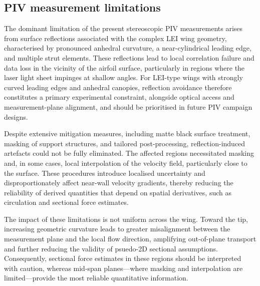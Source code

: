 \documentclass[wes, manuscript]{copernicus}
\begin{document}
\subsection{PIV measurement limitations}
%
The dominant limitation of the present stereoscopic PIV measurements arises from surface reflections associated with the complex LEI wing geometry, characterised by pronounced anhedral curvature, a near-cylindrical leading edge, and multiple strut elements. These reflections lead to local correlation failure and data loss in the vicinity of the airfoil surface, particularly in regions where the laser light sheet impinges at shallow angles. For LEI-type wings with strongly curved leading edges and anhedral canopies, reflection avoidance therefore constitutes a primary experimental constraint, alongside optical access and measurement-plane alignment, and should be prioritised in future PIV campaign designs.

Despite extensive mitigation measures, including matte black surface treatment, masking of support structures, and tailored post-processing, reflection-induced artefacts could not be fully eliminated. The affected regions necessitated masking and, in some cases, local interpolation of the velocity field, particularly close to the surface. These procedures introduce localised uncertainty and disproportionately affect near-wall velocity gradients, thereby reducing the reliability of derived quantities that depend on spatial derivatives, such as circulation and sectional force estimates.

The impact of these limitations is not uniform across the wing. Toward the tip, increasing geometric curvature leads to greater misalignment between the measurement plane and the local flow direction, amplifying out-of-plane transport and further reducing the validity of psuedo-2D sectional assumptions. Consequently, sectional force estimates in these regions should be interpreted with caution, whereas mid-span planes—where masking and interpolation are limited—provide the most reliable quantitative information.
\end{document}

